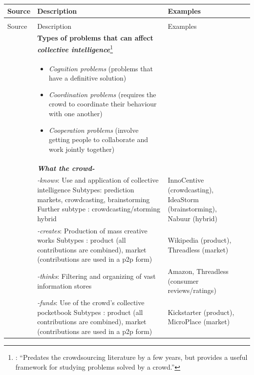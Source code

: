 \documentclass[letterpaper,10pt,pagesize=pdftex,headings=normal]{scrreprt}
\begin{document}
\begin{longtabu} to

\toprule 
Source & Description & Examples \\ 
  \midrule \endfirsthead
  
 \\
\midrule 
Source & Description & Examples \\ 
  \midrule \endhead 
  
\bottomrule \endlastfoot    
  
{} \endfoot


 & \textbf{Types of problems that can affect \emph{collective intelligence}}\footnote{\citet{nakatsu2014}: ``Predates the crowdsourcing literature by a few years, but provides a useful framework for studying problems solved by a crowd.''} & \\
\cmidrule(l){2-3}
& \parbox{\hsize}{
\begin{itemize}[leftmargin=*,nosep]
\item \emph{Cognition problems} (problems that have a definitive solution)
\item \emph{Coordination problems} (requires the crowd to coordinate their behaviour with one another)
\item \emph{Cooperation problems} (involve getting people to collaborate and work jointly together)
\end{itemize}} & \\

\midrule

 & \textbf{\emph{What the crowd-}} & \\
\cmidrule(l){2-3}
& \emph{-knows}: Use and application of collective intelligence \linebreak
Subtypes: prediction markets, crowdcasting, brainstorming\linebreak
Further subtype \citep{geerts2009}: crowdcasting/storming hybrid & InnoCentive (crowdcasting), IdeaStorm (brainstorming), Nabuur (hybrid)\\ 
\cmidrule(l){2-3}
& \emph{-creates}: Production of mass creative works \linebreak Subtypes \citep{geerts2009}: product (all contributions are combined), market (contributions are used in a p2p form) & Wikipedia (product), Threadless (market)\\
\cmidrule(l){2-3}
& \emph{-thinks}: Filtering and organizing of vast information stores & Amazon, Threadless (consumer reviews/ratings) \\
\cmidrule(l){2-3}
& \emph{-funds}: Use of the crowd's collective pocketbook \linebreak Subtypes \citep{geerts2009}: product (all contributions are combined), market (contributions are used in a p2p form) & Kickstarter (product), MicroPlace (market) \\


\end{longtabu}
\end{document}
